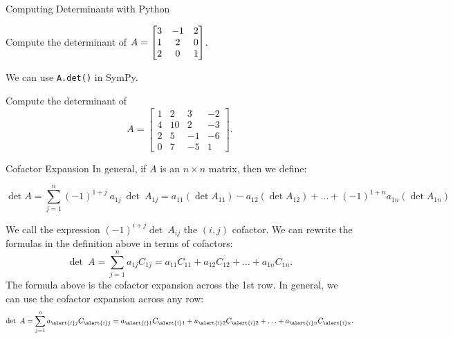 \documentclass[xcolor=dvipsnames,aspectratio=169,t]{beamer}
\begin{document}
\begin{frame}{Computing Determinants with Python}

Compute the determinant of $\displaystyle A = \begin{bmatrix} 3  & -1 & 2 \\ 1 & 2 & 0 \\ 2 & 0 & 1 \end{bmatrix}$.

\bigskip

We can use \alert{\texttt{A.det()}} in SymPy.

\bigskip

\pause
Compute the determinant of  
\[ A = \begin{bmatrix} 1  & 2 & 3 & -2\\ 4 & 10 & 2 & -3 \\ 2 & 5 & -1 & -6\\ 0 & 7 & -5 & 1 \end{bmatrix}. \]

\end{frame}


\begin{frame}{Cofactor Expansion}
\bbox
In general, if $A$ is an $n \times n$ matrix, then we define:

\vspace{-0.25in}
\[ \det A = \sum_{j=1}^n (-1)^{1+j} \ a_{1j} \ \det \ A_{1j} = a_{11} (\det A_{11} ) - a_{12} (\det A_{12} )+ \ldots + (-1)^{1+n}a_{1n} (\det A_{1n} ) \]
\ebox

\bi
\ii We call the expression $(-1)^{i+j} \det \ A_{ij}$ the $(i,j)$ \alert{cofactor.}
\ii We can rewrite the formulas in the definition above in terms of cofactors:
\[ \det \ A = \sum_{j=1}^n a_{1j} C_{1j}  = a_{11} C_{11} +  a_{12} C_{12} + \ldots + a_{1n} C_{1n}.\] 
\ii The formula above is the \alert{cofactor expansion across the 1st row}.
\ii In general, we can use the cofactor expansion \alert{across any row}:
\[ \det \ A = \sum_{j=1}^n a_{\alert{i}j} C_{\alert{i}j}  = a_{\alert{i}1} C_{\alert{i}1} +  a_{\alert{i}2} C_{\alert{i}2} + \ldots + a_{\alert{i}n} C_{\alert{i}n}.\] 
\ei

\end{frame}
\end{document}
